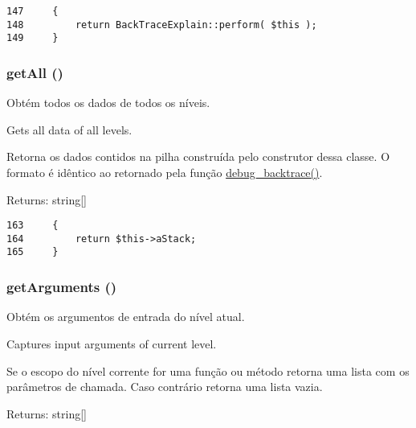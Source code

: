 \begin{Code}\begin{verbatim}147     {
148         return BackTraceExplain::perform( $this );
149     }
\end{verbatim}
\end{Code}


\hypertarget{class_back_trace_ba0d5b303383fb5b1fabb5fd01cd3800}{
\subsubsection[{getAll}]{\setlength{\rightskip}{0pt plus 5cm}getAll ()}}
\label{class_back_trace_ba0d5b303383fb5b1fabb5fd01cd3800}


Obtém todos os dados de todos os níveis.

Gets all data of all levels.

Retorna os dados contidos na pilha construída pelo construtor dessa classe. O formato é idêntico ao retornado pela função \hyperlink{}{debug\_\-backtrace()}.

\begin{Desc}
\item[Returns:]string\mbox{[}\mbox{]} \end{Desc}


\begin{Code}\begin{verbatim}163     {
164         return $this->aStack;
165     }
\end{verbatim}
\end{Code}


\hypertarget{class_back_trace_1d4c324c5a088be98d99d3efbf3502e1}{
\subsubsection[{getArguments}]{\setlength{\rightskip}{0pt plus 5cm}getArguments ()}}
\label{class_back_trace_1d4c324c5a088be98d99d3efbf3502e1}


Obtém os argumentos de entrada do nível atual.

Captures input arguments of current level.

Se o escopo do nível corrente for uma função ou método retorna uma lista com os parâmetros de chamada. Caso contrário retorna uma lista vazia.

\begin{Desc}
\item[Returns:]string\mbox{[}\mbox{]} \end{Desc}


